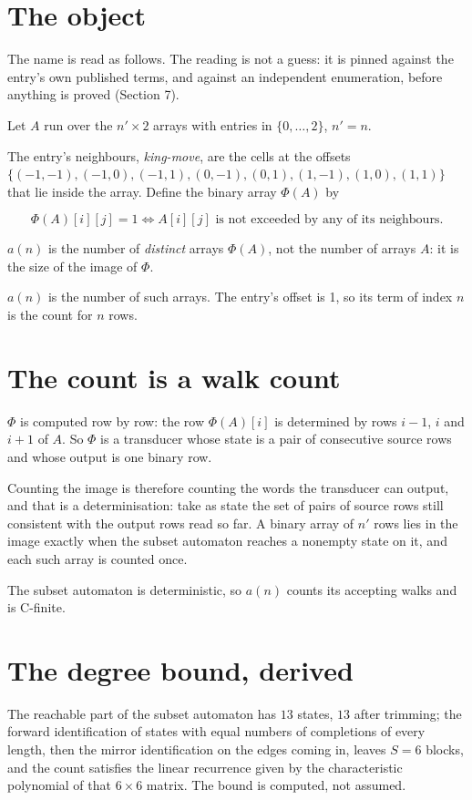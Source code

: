 \documentclass[11pt]{article}
\theoremstyle{definition}
\begin{document}
\section{The object}

The name is read as follows. The reading is not a guess: it is pinned against the entry's own published terms, and against an independent enumeration, before anything is proved (Section 7).

Let $A$ run over the $n' \times 2$ arrays with entries in $\{0,\dots,2\}$, $n' = n$.

The entry's neighbours, {\itshape king-move}, are the cells at the offsets $\{(-1,-1), (-1,0), (-1,1), (0,-1), (0,1), (1,-1), (1,0), (1,1)\}$ that lie inside the array. Define the binary array $\Phi(A)$ by

\[\Phi(A)[i][j] = 1 \iff A[i][j] \text{ is not exceeded by any of its neighbours}.\]

$a(n)$ is the number of {\itshape distinct} arrays $\Phi(A)$, not the number of arrays $A$: it is the size of the image of $\Phi$.

$a(n)$ is the number of such arrays. The entry's offset is 1, so its term of index $n$ is the count for $n$ rows.

\section{The count is a walk count}

$\Phi$ is computed row by row: the row $\Phi(A)[i]$ is determined by rows $i-1$, $i$ and $i+1$ of $A$. So $\Phi$ is a transducer whose state is a pair of consecutive source rows and whose output is one binary row.

Counting the image is therefore counting the words the transducer can output, and that is a determinisation: take as state the set of pairs of source rows still consistent with the output rows read so far. A binary array of $n'$ rows lies in the image exactly when the subset automaton reaches a nonempty state on it, and each such array is counted once.

The subset automaton is deterministic, so $a(n)$ counts its accepting walks and is C-finite.

\section{The degree bound, derived}

The reachable part of the subset automaton has $13$ states, $13$ after trimming; the forward identification of states with equal numbers of completions of every length, then the mirror identification on the edges coming in, leaves $S = 6$ blocks, and the count satisfies the linear recurrence given by the characteristic polynomial of that $6\times6$ matrix. The bound is computed, not assumed.
\end{document}
